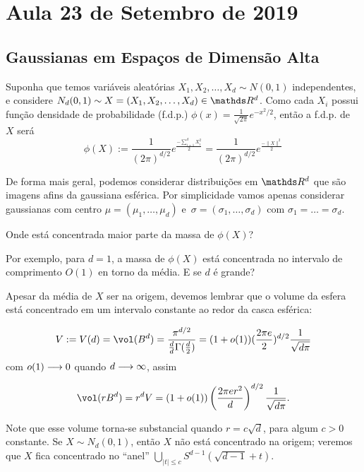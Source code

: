 \section{Aula 23 de Setembro de 2019}
\label{2019_09_23}

\subsection{Gaussianas em Espaços de Dimensão Alta}

Suponha que temos variáveis aleatórias ${ X_1, X_2, \dots, X_d \sim N(0,1)}$
independentes, e considere $N_d(0,1) \sim X = (X_1, X_2, \dots, X_d) \in \RR^d$.
Como cada $X_i$ possui função densidade de probabilidade (f.d.p.) 
$\phi(x) = \frac{1}{\sqrt{2\pi}}e^{-x^2/2}$, então a f.d.p. de $X$ será
\begin{equation*}\label{key}
\phi(X) := \frac{1}{(2\pi)^{d/2}}e^{\frac{-\sum_{i = 1}^{d}{X_i^2}}{2}}
= \frac{1}{(2\pi)^{d/2}}e^{\frac{-\|X\|^2}{2}}
\end{equation*}

De forma mais geral, podemos considerar distribuições em $\RR^d$ que são
imagens afins da gaussiana esférica. Por simplicidade vamos apenas considerar
gaussianas com centro $\mu = (\mu_1, \dots, \mu_d)$ 
e~$\sigma = (\sigma_1, \dots, \sigma_d)$ com $\sigma_1 = \dots = \sigma_d$.

\begin{pergunta}
	Onde está concentrada maior parte da massa de $\phi(X)$?
\end{pergunta}
Por exemplo, para $d = 1$, a massa de $\phi(X)$ está concentrada no intervalo
de comprimento $O(1)$ en torno da média. E se $d$ é grande?

Apesar da média de $X$ ser na origem, devemos lembrar que o volume da esfera
está concentrado em um intervalo constante ao redor da casca esférica:

\begin{equation*}\label{key}
V := V(d) = \vol(B^d) = \frac{\pi^{d/2}}{\frac{d}{d}\Gamma(\frac{d}{2})} 
   = (1 + o(1))(\frac{2\pi e}{2})^{d/2}\frac{1}{\sqrt{d\pi}}
\end{equation*}
com  $o(1)\longrightarrow 0$  quando $d\longrightarrow \infty$, assim

\begin{equation*}\label{key}
\vol (rB^d) = r^d V 
= (1 + o(1))\left(\frac{2\pi e r^2}{d}\right)^{d/2}\frac{1}{\sqrt{d\pi}}.
\end{equation*}

Note que esse volume torna-se substancial quando $r = c\sqrt{d}$, para algum 
$c>0$ constante. Se $X\sim N_d(0,1)$, então $X$ não está concentrado na
origem; veremos que $X$ fica concentrado no ``anel'' 
$\bigcup_{|t|\leq c}S^{d-1}(\sqrt{d-1} + t)$.

